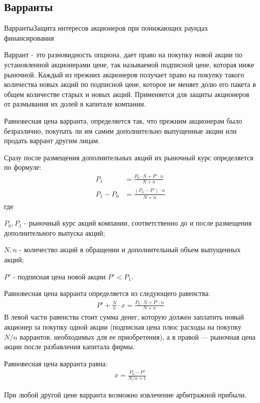 \documentclass[_Venture_p2.tex]{subfiles}
\begin{document}
\subsection{Варранты}
\begin{frame}{Варранты}{Защита интересов акционеров при понижающих раундах финансирования}
	\begin{block}{Варрант}
		\quad - это разновидность опциона, дает право на покупку новой акции по установленной акционерами цене, так называемой подписной цене, которая ниже рыночной. Каждый из прежних акционеров получает право на покупку такого количества новых акций по подписной цене, которое не меняет долю его пакета в общем количестве старых и новых акций. Применяется для защиты акционеров от размывания их долей в капитале компании.
	\end{block}
	
\end{frame}

\begin{frame}
Равновесная цена варранта, определяется так, что прежним акционерам было безразлично, покупать ли им самим дополнительно выпущенные акции или продать варрант другим лицам.
\end{frame}

\begin{frame}
Сразу после размещения дополнительных акций их рыночный курс определяется по формуле:
\begin{align}
P_1&=\frac{P_0 \cdot N + P' \cdot n}{N + n}\\
P_1-P_0 &=\frac{(P_0 - P') \cdot n }{N+n}
\end{align}
где

$P_0, P_1$ - рыночный курс акций компании, соответственно до и после размещения дополнительного выпуска акций;

$N, n$ - количество акций в обращении и дополнительный объем выпущенных акций;

$P'$ - подписная цена новой акции $P'< P_1$.
\end{frame}

\begin{frame}
Равновесная цена варранта определяется из следующего равенства:
\begin{align}
P'+ \frac{N}{n} \cdot x = \frac{P_0 \cdot N + P' \cdot n}{N + n}
\end{align}
В левой части равенства стоит сумма денег, которую должен заплатить новый акционер за покупку одной акции (подписная цена плюс расходы на покупку $N / n$ варрантов, необходимых для ее приобретения), а в правой — рыночная цена акции после разбавления капитала фирмы.
\end{frame}

\begin{frame}
Равновесная цена варранта равна:
\begin{align}
x=\frac{P_0 - P'}{N/n + 1}
\end{align}

При любой другой цене варранта возможно извлечение арбитражной прибыли.
\end{frame}
\end{document}
